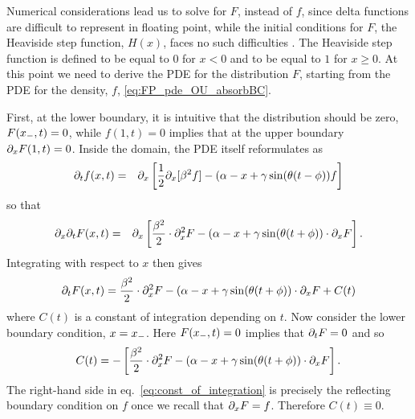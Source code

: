 
Numerical considerations lead us to solve for $F$, instead of $f$, since delta
functions are difficult to represent in floating point, while the initial
conditions for $F$, the Heaviside step function, $H(x)$, faces no such
difficulties \cite{Hurn2005}. The Heaviside step function is defined to be
equal to $0$ for $x<0$ and to be equal to $1$ for $x \geq 0$. At this point we
need to derive the PDE for the distribution $F$, starting from the PDE for the
density, $f$, \cref{eq:FP_pde_OU_absorbBC}.

First, at the lower boundary, it is intuitive that the distribution should be
zero, $ F({ x_{-} },t) = 0 $, while $f(1,t) = 0$ implies that at the upper boundary
$ {\partial}_xF(1, t) = 0 $. Inside the domain, the PDE itself reformulates as
\begin{eqnarray*}
{\partial}_t f(x,t) &=&  {\partial}_x \left[\frac{1}{2}{\partial}_x [\beta^2 f] -  (\alpha - x + {\gamma } \sin({ \theta}
(t - \phi)) f \right]
\end{eqnarray*}
so that
\begin{eqnarray*}
{\partial}_x {\partial}_t F(x,t) &=& {\partial}_x \left[
\frac{\beta^2 }{2}\cdot {\partial}^2_x F -  
						(\alpha- x + {\gamma } \sin({ \theta} (t + \phi))  \cdot {\partial}_xF \right].
\end{eqnarray*}
Integrating with respect to $x$ then gives
$$
{\partial}_t F(x,t) =
\frac{\beta^2 }{2}\cdot {\partial}^2_x F -  
						(\alpha- x + {\gamma } \sin({ \theta} (t + \phi))  \cdot {\partial}_xF + C(t)
$$
where $C(t)$ is a constant of integration depending on $t$. Now consider
the lower boundary condition, $x =
{ x_{-} }$. Here $F({ x_{-} },t) = 0$ implies that ${\partial}_tF = 0$ and so 
\begin{equation}
C(t) = - \left[ \frac{\beta^2 }{2}\cdot {\partial}^2_x F -  
			(\alpha- x + {\gamma } \sin({ \theta} (t + \phi))  \cdot {\partial}_xF \right].	
\label{eq:const_of_integration}
\end{equation}
The right-hand side in eq.\ \eqref{eq:const_of_integration} is precisely the
reflecting boundary condition on $f$ once we recall that ${\partial}_x F = f$. Therefore $C(t) \equiv 0$.

